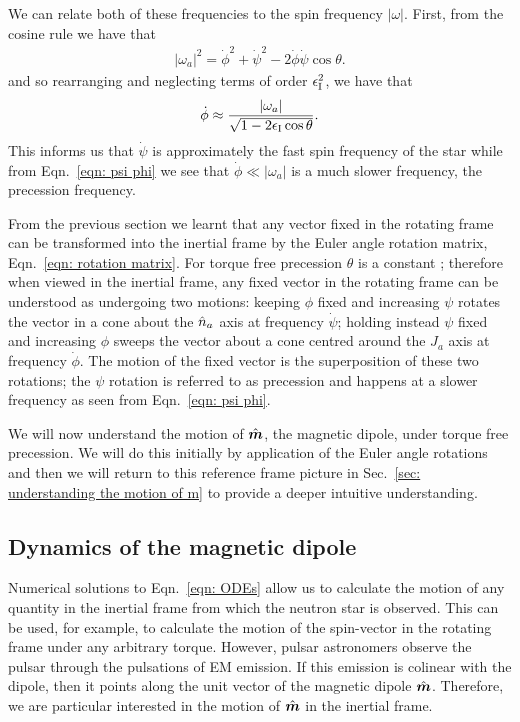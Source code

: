 \documentclass[../full_thesis/full_thesis.tex]{subfiles}
\begin{document}
We can relate both of these frequencies to the spin frequency $|\omega|$.
First, from the cosine rule we have that
\begin{align}
|\omega_a|^{2} = \dot{\phi}^{2}+\dot{\psi}^{2} - 2\dot{\phi}\dot{\psi}\cos\theta.
\end{align}
and so rearranging and neglecting terms of order $\epsilon_{\mathrm{I}}^{2}$, we have that
\begin{align}
\dot{\phi} \approx \frac{|\omega_a|}{\sqrt{1- 2\epsilon_{\mathrm{I}}\cos\theta}}.
\label{eqn: phi dot}
\end{align}
This informs us that $\dot{\psi}$ is approximately the fast spin frequency
of the star while from Eqn.~\eqref{eqn: psi phi} we see that $\dot{\phi} \ll |\omega_a|$
is a much slower frequency, the precession frequency.

From the previous section we learnt that any vector fixed in the rotating frame
can be transformed into the inertial frame by the Euler angle rotation matrix,
Eqn.~\eqref{eqn: rotation matrix}. For torque free precession $\theta$ is a
constant \citep{Landau1969}; therefore when viewed in the inertial frame, any
fixed vector in the rotating frame can be understood as undergoing two motions:
keeping $\phi$ fixed and increasing $\psi$ rotates the vector in a cone
about the $\hat{n}_{a}$ axis at frequency $\dot{\psi}$; holding
instead $\psi$ fixed and increasing $\phi$ sweeps the vector about a cone
centred around the $\hat{J}_a$ axis at frequency
$\dot{\phi}$. The motion of the fixed vector is the superposition of these two
rotations; the $\psi$ rotation is referred to as precession and happens at a
slower frequency as seen from Eqn.~\eqref{eqn: psi phi}.

We will now understand the motion of $\hat{\boldsymbol{m}}$, the magnetic dipole, under torque
free precession. We will do this initially by application of the Euler angle
rotations and then we will return to this reference frame picture in
Sec.~\ref{sec: understanding the motion of m} to provide a deeper intuitive
understanding.

\subsection{Dynamics of the magnetic dipole}

Numerical solutions to Eqn.~\eqref{eqn: ODEs} allow us to calculate the motion
of any quantity in the inertial frame from which the neutron star is observed.
This can be used, for example, to calculate the motion of the spin-vector in the
rotating frame under any arbitrary torque. However, pulsar astronomers observe the pulsar
through the pulsations of EM emission. If this emission is colinear with the
dipole, then it points along the unit vector of the magnetic dipole $\hat{\boldsymbol{m}}$. Therefore,
we are particular interested in the motion of $\hat{\boldsymbol{m}}$ in the inertial frame.
\end{document}
